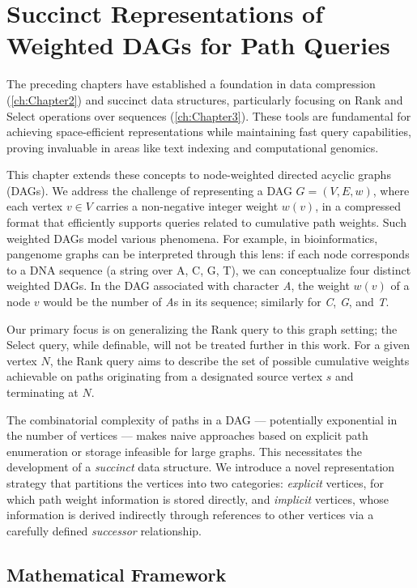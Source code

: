 \chapter{Succinct Representations of Weighted DAGs for Path Queries}
\label{chap:succinct_dags}

The preceding chapters have established a foundation in data compression (\autoref{ch:Chapter2}) and succinct data structures, particularly focusing on Rank and Select operations over sequences (\autoref{ch:Chapter3}). These tools are fundamental for achieving space-efficient representations while maintaining fast query capabilities, proving invaluable in areas like text indexing and computational genomics.

This chapter extends these concepts to node-weighted directed acyclic graphs (DAGs). We address the challenge of representing a DAG $G=(V, E, w)$, where each vertex $v \in V$ carries a non-negative integer weight $w(v)$, in a compressed format that efficiently supports queries related to cumulative path weights. Such weighted DAGs model various phenomena. For example, in bioinformatics, pangenome graphs can be interpreted through this lens: if each node corresponds to a DNA sequence (a string over {A, C, G, T}), we can conceptualize four distinct weighted DAGs. In the DAG associated with character \emph{A}, the weight $w(v)$ of a node $v$ would be the number of \emph{A}s in its sequence; similarly for \emph{C}, \emph{G}, and \emph{T}.

Our primary focus is on generalizing the Rank query to this graph setting; the Select query, while definable, will not be treated further in this work. For a given vertex $N$, the Rank query aims to describe the set of possible cumulative weights achievable on paths originating from a designated source vertex $s$ and terminating at $N$.

The combinatorial complexity of paths in a DAG — potentially exponential in the number of vertices — makes naive approaches based on explicit path enumeration or storage infeasible for large graphs. This necessitates the development of a \emph{succinct} data structure. We introduce a novel representation strategy that partitions the vertices into two categories: \emph{explicit} vertices, for which path weight information is stored directly, and \emph{implicit} vertices, whose information is derived indirectly through references to other vertices via a carefully defined \emph{successor} relationship.

\section{Mathematical Framework}
\label{sec:dag_formal_defs}

